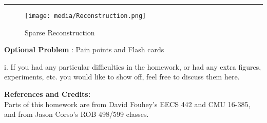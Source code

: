 \documentclass[onecolumn,10pt]{article}
\begin{document}
\hrule
\begin{figure}
  \centering
  \texttt{[image: media/Reconstruction.png]} %
  \caption{Sparse Reconstruction}
  \label{fig:reconstruction}
\end{figure}


\addtocounter{problemnumber}{1}
\noindent\textbf{Optional Problem }: Pain points and Flash cards

i. If you had any particular difficulties in the homework, or had any extra figures, experiments, etc. you would like to show off, feel free to discuss them here.



\noindent\textbf{References and Credits:}\\
Parts of this homework are from David Fouhey's EECS 442 and CMU 16-385, and from Jason Corso's ROB 498/599 classes.
\end{document}
